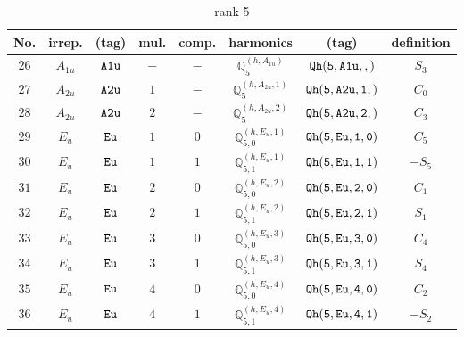 \documentclass[fleqn,8pt]{jsarticle}
\begin{document}
\begin{table}[ht!]
\begin{center}
\caption{rank 5}
\renewcommand{\arraystretch}{1.3}
\begin{tabular}{cccccccc} \hline \hline
No. & irrep. & (tag) & mul. & comp. & harmonics & (tag) & definition \\ \hline
$ 26 $ & $ A_{1u} $ & $ {\tt A1u} $ & $ - $ & $ - $ & $ \mathbb{Q}_{5}^{(h,A_{1u})} $ & $ {\tt Qh(5,A1u,,)} $ & $ S_{3} $ \\
$ 27 $ & $ A_{2u} $ & $ {\tt A2u} $ & $ 1 $ & $ - $ & $ \mathbb{Q}_{5}^{(h,A_{2u},1)} $ & $ {\tt Qh(5,A2u,1,)} $ & $ C_{0} $ \\
$ 28 $ & $ A_{2u} $ & $ {\tt A2u} $ & $ 2 $ & $ - $ & $ \mathbb{Q}_{5}^{(h,A_{2u},2)} $ & $ {\tt Qh(5,A2u,2,)} $ & $ C_{3} $ \\
$ 29 $ & $ E_{u} $ & $ {\tt Eu} $ & $ 1 $ & $ 0 $ & $ \mathbb{Q}_{5,0}^{(h,E_{u},1)} $ & $ {\tt Qh(5,Eu,1,0)} $ & $ C_{5} $ \\
$ 30 $ & $ E_{u} $ & $ {\tt Eu} $ & $ 1 $ & $ 1 $ & $ \mathbb{Q}_{5,1}^{(h,E_{u},1)} $ & $ {\tt Qh(5,Eu,1,1)} $ & $ - S_{5} $ \\
$ 31 $ & $ E_{u} $ & $ {\tt Eu} $ & $ 2 $ & $ 0 $ & $ \mathbb{Q}_{5,0}^{(h,E_{u},2)} $ & $ {\tt Qh(5,Eu,2,0)} $ & $ C_{1} $ \\
$ 32 $ & $ E_{u} $ & $ {\tt Eu} $ & $ 2 $ & $ 1 $ & $ \mathbb{Q}_{5,1}^{(h,E_{u},2)} $ & $ {\tt Qh(5,Eu,2,1)} $ & $ S_{1} $ \\
$ 33 $ & $ E_{u} $ & $ {\tt Eu} $ & $ 3 $ & $ 0 $ & $ \mathbb{Q}_{5,0}^{(h,E_{u},3)} $ & $ {\tt Qh(5,Eu,3,0)} $ & $ C_{4} $ \\
$ 34 $ & $ E_{u} $ & $ {\tt Eu} $ & $ 3 $ & $ 1 $ & $ \mathbb{Q}_{5,1}^{(h,E_{u},3)} $ & $ {\tt Qh(5,Eu,3,1)} $ & $ S_{4} $ \\
$ 35 $ & $ E_{u} $ & $ {\tt Eu} $ & $ 4 $ & $ 0 $ & $ \mathbb{Q}_{5,0}^{(h,E_{u},4)} $ & $ {\tt Qh(5,Eu,4,0)} $ & $ C_{2} $ \\
$ 36 $ & $ E_{u} $ & $ {\tt Eu} $ & $ 4 $ & $ 1 $ & $ \mathbb{Q}_{5,1}^{(h,E_{u},4)} $ & $ {\tt Qh(5,Eu,4,1)} $ & $ - S_{2} $ \\
 \hline \hline
\end{tabular}
\end{center}
\end{table}
\end{document}
